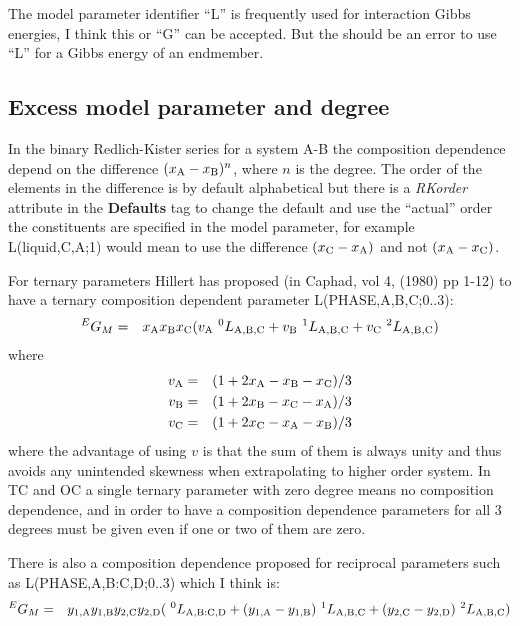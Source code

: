 \documentclass{article}
\begin{document}
The model parameter identifier ``L'' is frequently used for
interaction Gibbs energies, I think this or ``G'' can be accepted.
But the should be an error to use ``L'' for a Gibbs energy of an
endmember.

\subsection{Excess model parameter and degree}\label{sec:degree}\label{sec:rkorder}

In the binary Redlich-Kister series for a system A-B the composition
dependence depend on the difference $(x_{\rm A}-x_{\rm B})^n$, where
$n$ is the degree.  The order of the elements in the difference is by
default alphabetical but there is a {\em RKorder} attribute in the
{\bf Defaults} tag to change the default and use the ``actual'' order
the constituents are specified in the model parameter, for example
L(liquid,C,A;1) would mean to use the difference $(x_{\rm C}-x_{\rm
  A})$ and not $(x_{\rm A}-x_{\rm C})$.

For ternary parameters Hillert has proposed (in Caphad, vol 4, (1980)
pp 1-12) to have a ternary composition dependent parameter L(PHASE,A,B,C;0..3):
\begin{eqnarray}
^EG_M &=& x_{\rm A}x_{\rm B}x_{\rm C}(v_{\rm A}~^0L_{\rm A,B,C}+v_{\rm B}~^1L_{\rm A,B,C}+v_{\rm C}~^2L_{\rm A,B,C}) \label{eq:hillert3}
\end{eqnarray}
where
\begin{eqnarray}
v_{\rm A} &=& (1+2x_{\rm A}-x_{\rm B}-x_{\rm C})/3\\
v_{\rm B} &=& (1+2x_{\rm B}-x_{\rm C}-x_{\rm A})/3\\
v_{\rm C} &=& (1+2x_{\rm C}-x_{\rm A}-x_{\rm B})/3
\end{eqnarray}
where the advantage of using $v$ is that the sum of them is always
unity and thus avoids any unintended skewness when extrapolating to
higher order system.  In TC and OC a single ternary parameter with
zero degree means no composition dependence, and in order to have a
composition dependence parameters for all 3 degrees must be given even
if one or two of them are zero.

There is also a composition dependence proposed for reciprocal
parameters such as L(PHASE,A,B:C,D;0..3) which I think is:
\begin{eqnarray}
  ^EG_M &=& y_{1,\rm A}y_{1,\rm B}y_{2,\rm C}y_{2,\rm D} (~^0L_{\rm A,B:C,D} +  (y_{1,\rm A}-y_{1,\rm B})~^1L_{\rm A,B,C} + (y_{2,\rm C}-y_{2,\rm D})~^2L_{\rm A,B,C})  \label{eq:hillert4}
\end{eqnarray}
\end{document}
